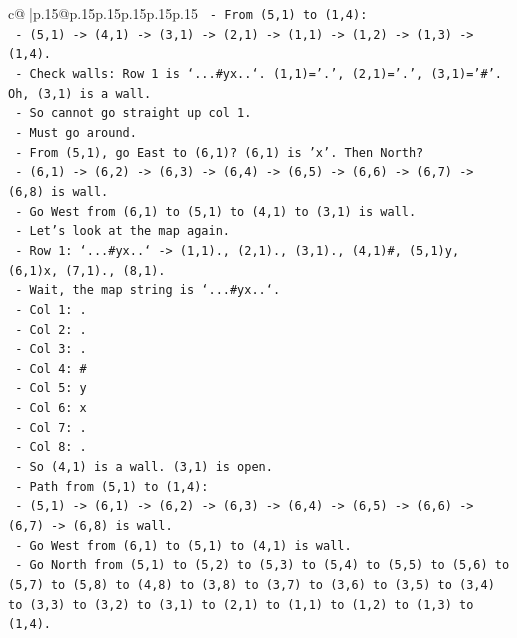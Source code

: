 \documentclass{article}
\begin{document}
{\begin{supertabular}{c@{$\;$}|p{.15\linewidth}@{}p{.15\linewidth}p{.15\linewidth}p{.15\linewidth}p{.15\linewidth}p{.15\linewidth}}
{{{\texttt{    {-} From (5,1) to (1,4):} \\
\texttt{      {-} (5,1) {-}> (4,1) {-}> (3,1) {-}> (2,1) {-}> (1,1) {-}> (1,2) {-}> (1,3) {-}> (1,4).} \\
\texttt{      {-} Check walls: Row 1 is `...\#yx..`. (1,1)='.', (2,1)='.', (3,1)='\#'. Oh, (3,1) is a wall.} \\
\texttt{      {-} So cannot go straight up col 1.} \\
\texttt{      {-} Must go around.} \\
\texttt{      {-} From (5,1), go East to (6,1)? (6,1) is 'x'. Then North?} \\
\texttt{      {-} (6,1) {-}> (6,2) {-}> (6,3) {-}> (6,4) {-}> (6,5) {-}> (6,6) {-}> (6,7) {-}> (6,8) is wall.} \\
\texttt{      {-} Go West from (6,1) to (5,1) to (4,1) to (3,1) is wall.} \\
\texttt{      {-} Let's look at the map again.} \\
\texttt{      {-} Row 1: `...\#yx..` {-}> (1,1)., (2,1)., (3,1)., (4,1)\#, (5,1)y, (6,1)x, (7,1)., (8,1).} \\
\texttt{      {-} Wait, the map string is `...\#yx..`.} \\
\texttt{        {-} Col 1: .} \\
\texttt{        {-} Col 2: .} \\
\texttt{        {-} Col 3: .} \\
\texttt{        {-} Col 4: \#} \\
\texttt{        {-} Col 5: y} \\
\texttt{        {-} Col 6: x} \\
\texttt{        {-} Col 7: .} \\
\texttt{        {-} Col 8: .} \\
\texttt{      {-} So (4,1) is a wall. (3,1) is open.} \\
\texttt{      {-} Path from (5,1) to (1,4):} \\
\texttt{        {-} (5,1) {-}> (6,1) {-}> (6,2) {-}> (6,3) {-}> (6,4) {-}> (6,5) {-}> (6,6) {-}> (6,7) {-}> (6,8) is wall.} \\
\texttt{        {-} Go West from (6,1) to (5,1) to (4,1) is wall.} \\
\texttt{        {-} Go North from (5,1) to (5,2) to (5,3) to (5,4) to (5,5) to (5,6) to (5,7) to (5,8) to (4,8) to (3,8) to (3,7) to (3,6) to (3,5) to (3,4) to (3,3) to (3,2) to (3,1) to (2,1) to (1,1) to (1,2) to (1,3) to (1,4).} \\
}}}
\end{supertabular}}
\end{document}
